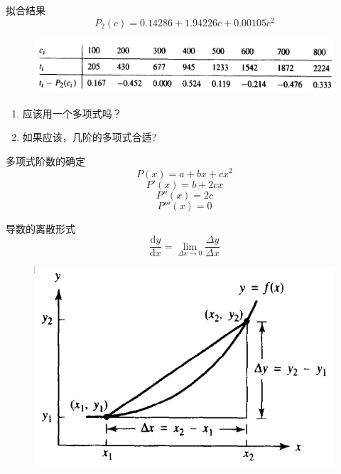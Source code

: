 \documentclass[UTF8]{ctexbeamer}
\begin{document}
\begin{frame}{拟合结果}
  \[
  P_2(c) = 0.14286 + 1.94226c + 0.00105c^2
  \]

  \begin{figure}
    \centering
    \includegraphics[width=.7\textwidth{}]{record-fit2.png}
  \end{figure}

  \begin{enumerate}
  \item 应该用一个多项式吗？
  \item 如果应该，几阶的多项式合适?
  \end{enumerate}
  
\end{frame}

\begin{frame}{多项式阶数的确定}
  \[
  P(x) = a + bx + cx^2
  \]
  \[
  P'(x) = b+2cx
  \]
  \[
  P''(x) = 2c
  \]
  \[
  P'''(x) = 0
  \]

\end{frame}

\begin{frame}{导数的离散形式}
  \[
  \frac{\mathrm{d}y}{\mathrm{d}x} = \lim_{\Delta x \rightarrow 0}\frac{\Delta y}{\Delta x}
  \]

  \begin{figure}
    \centering
    \includegraphics[width=.6\textwidth{}]{dif-fig.png}
  \end{figure}
  
\end{frame}
\end{document}
